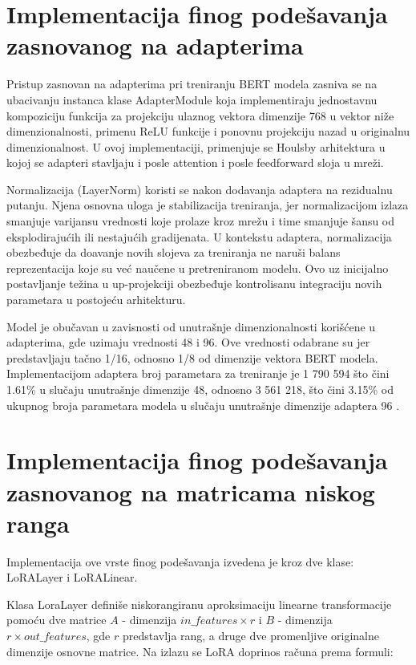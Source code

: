 \documentclass[12pt,oneside]{memoir}
\begin{document}
\section{Implementacija finog podešavanja zasnovanog na adapterima}

Pristup zasnovan na adapterima pri treniranju BERT modela zasniva se na ubacivanju instanca klase AdapterModule koja implementiraju jednostavnu kompoziciju  funkcija za projekciju ulaznog vektora dimenzije 768 u vektor niže dimenzionalnosti, primenu ReLU funkcije i ponovnu projekciju nazad u originalnu dimenzionalnost. U ovoj implementaciji, primenjuje se Houlsby arhitektura u kojoj se adapteri stavljaju i posle attention i posle feedforward sloja u mreži.

Normalizacija (LayerNorm) koristi se nakon dodavanja adaptera na rezidualnu putanju. Njena osnovna uloga je stabilizacija treniranja, jer normalizacijom izlaza smanjuje varijansu vrednosti koje prolaze kroz mrežu i time smanjuje šansu od eksplodirajućih ili nestajućih gradijenata. U kontekstu adaptera, normalizacija obezbeđuje da doavanje novih slojeva za treniranja ne naruši balans reprezentacija koje su već naučene u pretreniranom modelu. Ovo uz inicijalno postavljanje težina u up-projekciji obezbeđuje kontrolisanu integraciju novih parametara u postojeću arhitekturu.

Model je obučavan u zavisnosti od unutrašnje dimenzionalnosti korišćene u adapterima, gde uzimaju vrednosti 48 i 96. Ove vrednosti odabrane su jer predstavljaju tačno 1/16, odnosno 1/8 od dimenzije vektora BERT modela. Implementacijom adaptera broj parametara za treniranje je 1 790 594 što čini 1.61\% u slučaju unutrašnje dimenzije 48, odnosno  3 561 218, što čini 3.15\% od ukupnog broja parametara modela u slučaju unutrašnje dimenzije adaptera 96 . 

\section{Implementacija finog podešavanja zasnovanog na matricama niskog ranga}
Implementacija ove vrste finog podešavanja izvedena je kroz dve klase: LoRALayer i LoRALinear.

Klasa LoraLayer definiše niskorangiranu aproksimaciju linearne transformacije pomoću dve matrice $A$ - dimenzija \(in\_features \times r\) i $B$ - dimenzija \(r \times out\_features\), gde $r$  predstavlja rang, a druge dve promenljive originalne dimenzije osnovne matrice. Na izlazu se LoRA doprinos računa prema formuli:
\end{document}
